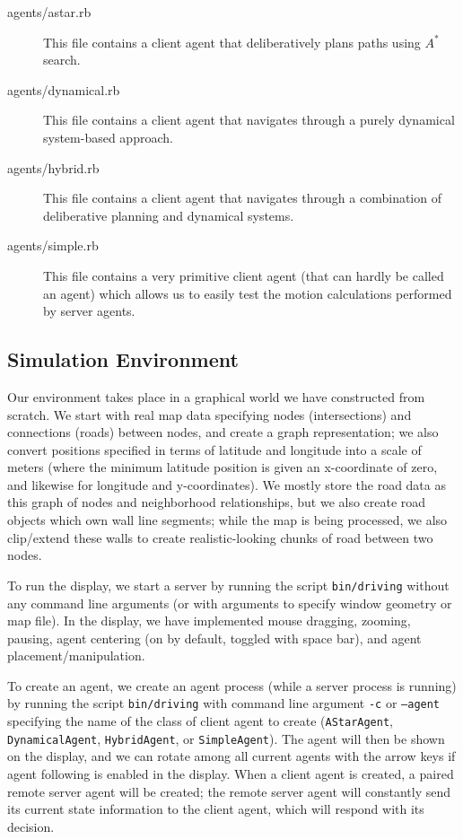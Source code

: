 \documentclass{article}
\newcommand{\code}{\texttt}
\begin{document}
\begin{description}
\item[agents/astar.rb] This file contains a client agent that deliberatively
  plans paths using $A^*$ search.

\item[agents/dynamical.rb] This file contains a client agent that navigates
  through a purely dynamical system-based approach.

\item[agents/hybrid.rb] This file contains a client agent that navigates through
  a combination of deliberative planning and dynamical systems.

\item[agents/simple.rb] This file contains a very primitive client agent (that
  can hardly be called an agent) which allows us to easily test the motion
  calculations performed by server agents.

\end{description}

\subsection{Simulation Environment}

Our environment takes place in a graphical world we have constructed from
scratch. We start with real map data specifying nodes (intersections) and
connections (roads) between nodes, and create a graph representation; we also
convert positions specified in terms of latitude and longitude into a scale of
meters (where the minimum latitude position is given an x-coordinate of zero,
and likewise for longitude and y-coordinates). We mostly store the road data as
this graph of nodes and neighborhood relationships, but we also create road
objects which own wall line segments; while the map is being processed, we also
clip/extend these walls to create realistic-looking chunks of road between two
nodes.

To run the display, we start a server by running the script \code{bin/driving}
without any command line arguments (or with arguments to specify window geometry
or map file). In the display, we have implemented mouse dragging, zooming,
pausing, agent centering (on by default, toggled with space bar), and agent
placement/manipulation.

To create an agent, we create an agent process (while a server process is
running) by running the script \code{bin/driving} with command line argument
\code{-c} or \code{--agent} specifying the name of the class of client agent to
create (\code{AStarAgent}, \code{DynamicalAgent}, \code{HybridAgent}, or
\code{SimpleAgent}). The agent will then be shown on the display, and we can
rotate among all current agents with the arrow keys if agent following is
enabled in the display. When a client agent is created, a paired remote server
agent will be created; the remote server agent will constantly send its current
state information to the client agent, which will respond with its decision.
\end{document}

